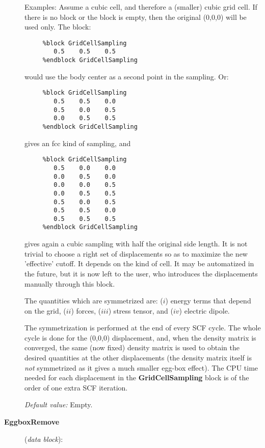 \begin{description}
Examples: Assume a cubic cell, and therefore a (smaller) cubic grid cell.
If there is no block or the block is empty, then the original (0,0,0)
will be used only. The block:

\begin{verbatim}
     %block GridCellSampling
        0.5    0.5    0.5
     %endblock GridCellSampling
\end{verbatim}

would use the body center as a second point in the sampling. Or:


\begin{verbatim}
     %block GridCellSampling
        0.5    0.5    0.0
        0.5    0.0    0.5
        0.0    0.5    0.5
     %endblock GridCellSampling
\end{verbatim}

gives an fcc kind of sampling, and

\begin{verbatim}
     %block GridCellSampling
        0.5    0.0    0.0
        0.0    0.5    0.0
        0.0    0.0    0.5
        0.0    0.5    0.5
        0.5    0.0    0.5
        0.5    0.5    0.0
        0.5    0.5    0.5
     %endblock GridCellSampling
\end{verbatim}

gives again a cubic sampling with half the original side length.
It is not trivial to choose a right set of displacements so as
to maximize the new 'effective' cutoff. It depends on the
kind of cell. It may be automatized in the future, but it
is now left to the user, who introduces the displacements
manually through this block.

The quantities which are symmetrized are: ($i$) energy terms
that depend on the grid, ($ii$) forces, ($iii$) stress
tensor, and ($iv$) electric dipole.

The symmetrization is performed at the end of every SCF cycle. The
whole cycle is done for the (0,0,0) displacement, and, when the
density matrix is converged, the same (now fixed)
density matrix is used to obtain the desired quantities at the
other displacements (the density matrix itself is \textit{not}
symmetrized as it gives a much smaller egg-box effect).
The CPU time needed for each displacement
in the \textbf{GridCellSampling} block
is of the order of one extra SCF iteration.

\textit{Default value:} Empty.


\item[\textbf{EggboxRemove}] (\textit{data block}):


\end{description}

